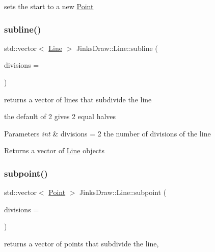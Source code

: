 sets the start to a new \mbox{\hyperlink{class_jinks_draw_1_1_point}{Point}} 

\mbox{\label{class_jinks_draw_1_1_line_a79047036e61d10ef3b14c660c32e6d64}} 
\subsubsection{\texorpdfstring{subline()}{subline()}}
{\footnotesize\ttfamily std\+::vector$<$ \mbox{\hyperlink{class_jinks_draw_1_1_line}{Line}} $>$ Jinks\+Draw\+::\+Line\+::subline (\begin{DoxyParamCaption}\item[{int}]{divisions = {} }\end{DoxyParamCaption})}



returns a vector of lines that subdivide the line 

the default of 2 gives 2 equal halves 
\begin{DoxyParams}{Parameters}
{\em int} & divisions = 2 the number of divisions of the line \\
\hline
\end{DoxyParams}
\begin{DoxyReturn}{Returns}
a vector of \mbox{\hyperlink{class_jinks_draw_1_1_line}{Line}} objects 
\end{DoxyReturn}
\mbox{\label{class_jinks_draw_1_1_line_a43d8f7b708f5e9851a188c755aa0d963}} 
\subsubsection{\texorpdfstring{subpoint()}{subpoint()}}
{\footnotesize\ttfamily std\+::vector$<$ \mbox{\hyperlink{class_jinks_draw_1_1_point}{Point}} $>$ Jinks\+Draw\+::\+Line\+::subpoint (\begin{DoxyParamCaption}\item[{int}]{divisions = {} }\end{DoxyParamCaption})}



returns a vector of points that subdivide the line, 

